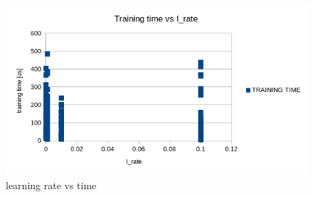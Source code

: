 \documentclass[runningheads]{llncs}
\begin{document}
\begin{figure}
  \includegraphics[width=\textwidth]{Screenshots/rate_vs_time.png}
  \caption{learning rate vs time}
  \label{fig:time}
\end{figure}
\end{document}
